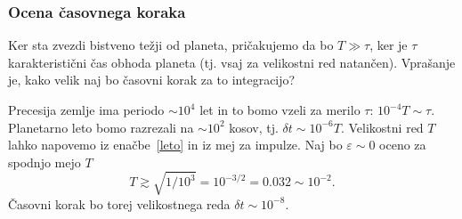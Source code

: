 \documentclass[12pt, a4paper]{article}
\begin{document}
\subsubsection{Ocena \v casovnega koraka}
Ker sta zvezdi bistveno te\v zji od planeta, pri\v cakujemo da bo $T \gg \tau$, ker je $\tau$ karakteristi\v cni
\v cas obhoda planeta (tj. vsaj za velikostni red natan\v cen). Vpra\v sanje je, kako velik naj bo \v casovni korak
za to integracijo?

Precesija zemlje ima periodo $\sim 10^4$ let in to bomo vzeli za merilo $\tau$: $10^{-4}T \sim \tau$. Planetarno
leto bomo razrezali na $\sim 10^2$ kosov, tj. $\delta t \sim 10^{-6} T$. Velikostni red $T$ lahko napovemo iz
ena\v cbe~\eqref{leto} in iz mej za impulze. Naj bo $\varepsilon \sim 0$ oceno za spodnjo mejo $T$
\[
    T \gtrsim \sqrt{1/10^3} = 10^{-3/2} = 0.032 \sim 10^{-2}.
\]
\v Casovni korak bo torej velikostnega reda $\delta t \sim 10^{-8}$.
\end{document}
